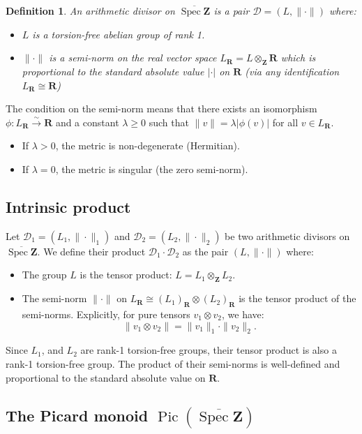 \documentclass[11pt,a4paper]{article}
\newcommand{\Z}{\mathbf{Z}}
\newcommand{\R}{\mathbf{R}}
\def\spzb{\overline{\Spec \Z}}
\newcommand{\Spec}{\operatorname{Spec}}
\def\Pic{\operatorname{Pic}}
\theoremstyle{plain}
\newtheorem{defn}[thm]{Definition}
\theoremstyle{definition} %
\begin{document}
\begin{defn}
An arithmetic divisor on $\spzb$ is a pair $\mathcal{D} = (L, \|\cdot\|)$ where:
\begin{itemize}
    \item $L$ is a torsion-free abelian group of rank 1.
    \item $\|\cdot\|$ is a semi-norm on the real vector space $L_\R = L \otimes_\Z \R$ which is proportional to the standard absolute value $|\cdot|$ on $\R$ (via any identification $L_\R \cong \R$) 
\end{itemize}
\end{defn}

The condition on the semi-norm means that there exists an isomorphism $\phi: L_\R \xrightarrow{\sim} \R$ and a constant $\lambda \ge 0$ such that  $\|v\| = \lambda |\phi(v)|$ for all $v \in L_\R$.
\begin{itemize}[leftmargin=*, labelindent=0pt]
    \item[] If $\lambda > 0$, the metric is non-degenerate (Hermitian).
    \item[] If $\lambda = 0$, the metric is singular (the zero semi-norm).
\end{itemize}

\subsection{Intrinsic product}

Let $\mathcal{D}_1 = (L_1, \|\cdot\|_1)$ and $\mathcal{D}_2 = (L_2, \|\cdot\|_2)$ be two arithmetic divisors on $\spzb$. We define their product $\mathcal{D}_1 \cdot \mathcal{D}_2$ as the pair $(L, \|\cdot\|)$ where:
\begin{itemize}[leftmargin=*, labelindent=0pt]
    \item[-] The group $L$ is the tensor product: $L = L_1 \otimes_\Z L_2$.
    \item[-] The semi-norm $\|\cdot\|$ on $L_\R \cong (L_1)_\R \otimes (L_2)_\R$ is the tensor product of the semi-norms. Explicitly, for pure tensors $v_1 \otimes v_2$, we have:
    \[
    \|v_1 \otimes v_2\| = \|v_1\|_1 \cdot \|v_2\|_2.
    \]
\end{itemize}
Since $L_1$, and  $L_2$ are rank-1 torsion-free groups, their tensor product is also a rank-1 torsion-free group. The product of their semi-norms is well-defined and proportional to the standard absolute value on $\R$.


\subsection{The  Picard monoid $\Pic(\spzb)$}
\end{document}
